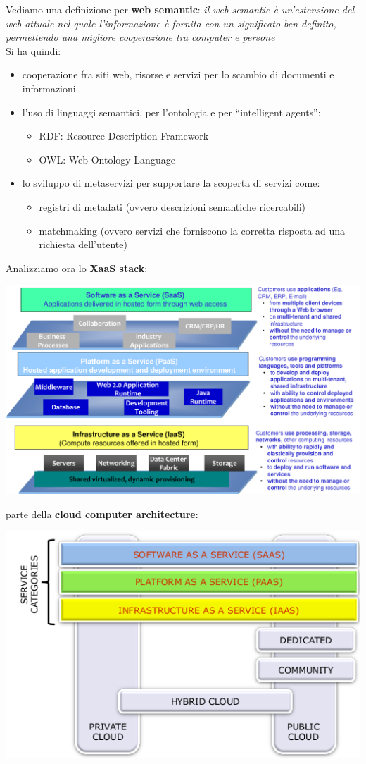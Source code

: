 \documentclass[a4paper,12pt, oneside]{book}
\begin{document}
Vediamo una definizione per \textbf{web semantic}: \textit{il web semantic è un'estensione del web attuale nel quale l'informazione
  è fornita con un significato ben definito, permettendo una migliore cooperazione tra computer e persone}\\
Si ha quindi:
\begin{itemize}
\item cooperazione fra siti web, risorse e servizi per lo scambio di documenti e informazioni
\item l'uso di linguaggi semantici, per l'ontologia e per ``intelligent agents'':
  \begin{itemize}
  \item RDF: Resource Description Framework
  \item OWL: Web Ontology Language
  \end{itemize}
\item lo sviluppo di metaservizi per supportare la scoperta di servizi come:
  \begin{itemize}
  \item registri di metadati (ovvero descrizioni semantiche ricercabili)
  \item matchmaking (ovvero servizi che forniscono la corretta risposta ad una richiesta dell'utente)
  \end{itemize}
\end{itemize}
Analizziamo ora lo \textbf{XaaS stack}:
\begin{center}
\includegraphics[scale=0.35]{img/xaas.png}
\end{center}
\newpage
parte della \textbf{cloud computer architecture}:
\begin{center}
\includegraphics[scale=0.7]{img/cloud.png}
\end{center}
\end{document}
